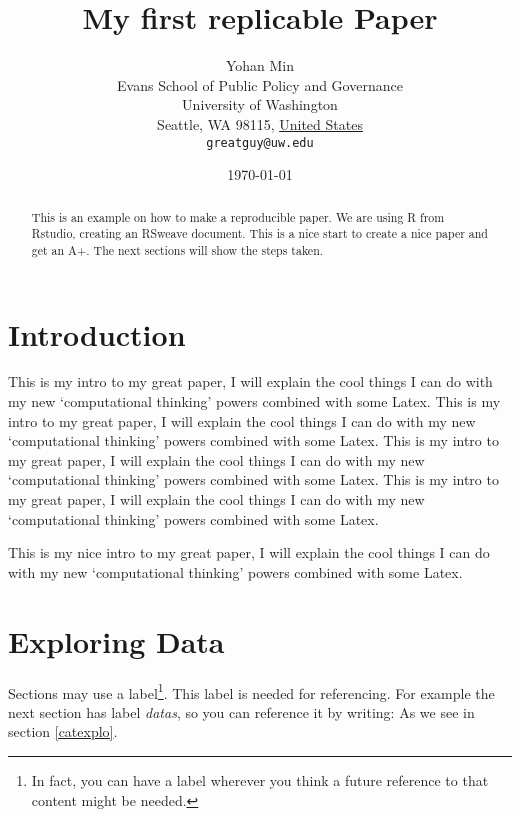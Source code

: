 \documentclass[11pt]{article}
\title{My first replicable Paper}
\author{
        Yohan Min\\
        Evans School of Public Policy and Governance\\
        University of Washington\\
        Seattle, WA 98115, \underline{United States}\\
        \texttt{greatguy@uw.edu}
}
\date{\today}
\begin{document}


\maketitle %


\begin{abstract}
This is an example on how to make a reproducible paper. We are using R from Rstudio, creating an RSweave document. This is a nice start to create a nice paper and get an A+. The next sections will show the steps taken.
\end{abstract}

\section{Introduction}\label{intro}  

This is my intro to my great paper, I will explain the cool things I can do with my new `computational thinking' powers combined with some Latex. This is my intro to my great paper, I will explain the cool things I can do with my new `computational thinking' powers combined with some Latex. This is my intro to my great paper, I will explain the cool things I can do with my new `computational thinking' powers combined with some Latex. This is my intro to my great paper, I will explain the cool things I can do with my new `computational thinking' powers combined with some Latex.

This is my nice intro to my great paper, 
I will explain the cool things 
I can do with my new `computational thinking' 
powers
combined with some Latex.


\section{Exploring Data}\label{explo}

Sections may use a label\footnote{In fact, you can have a label wherever you think a future reference to that content might be needed.}. This label is needed for referencing. For example the next section has label \emph{datas}, so you can reference it by writing: As we see in section \ref{catexplo}.
\end{document}
